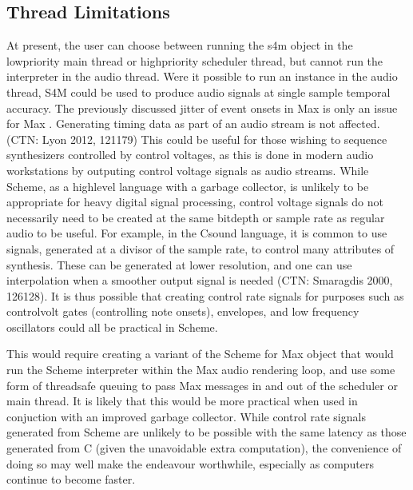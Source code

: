 \documentclass[letterpaper,10pt,english]{sphinxmanual}
\begin{document}
\subsection{Thread Limitations}
\label{\detokenize{conclusion:thread-limitations}}
\sphinxAtStartPar
At present, the user can choose between running the s4m object in the
low\sphinxhyphen{}priority main thread or high\sphinxhyphen{}priority scheduler thread, but cannot
run the interpreter in the audio thread.
Were it possible to run an instance in the audio thread, S4M could be
used to produce audio signals at single sample temporal accuracy.
The previously discussed jitter of event onsets in Max is only an issue
for Max . Generating timing data as part of an audio stream
is not affected. (CTN: Lyon 2012, 121\sphinxhyphen{}179)
This could be useful for those wishing to sequence synthesizers controlled
by control voltages, as this is done in modern audio workstations by outputing
control voltage signals as audio streams.
While Scheme, as a high\sphinxhyphen{}level language with a garbage collector, is unlikely
to be appropriate for heavy digital signal processing, control voltage
signals do not necessarily need to be created at the same bit\sphinxhyphen{}depth or
sample rate as regular audio to be useful. For example, in the Csound language,
it is common to use  signals, generated at a divisor of the sample
rate, to control many attributes of synthesis. These can be generated
at lower resolution, and one can use interpolation when a smoother output
signal is needed (CTN: Smaragdis 2000, 126\sphinxhyphen{}128).
It is thus possible that creating
control rate signals for purposes such as control\sphinxhyphen{}volt gates (controlling note onsets),
envelopes, and low frequency oscillators could all be practical in Scheme.

\sphinxAtStartPar
This would require creating a variant of the Scheme for Max object that would
run the Scheme interpreter within the Max audio rendering loop,
and use some form of thread\sphinxhyphen{}safe queuing to pass Max messages in and out of the
scheduler or main thread.
It is likely that this would be more practical when used in conjuction with
an improved garbage collector.
While control rate signals generated from Scheme are unlikely to be possible
with the same latency as those generated from C (given the unavoidable extra
computation), the convenience of doing so may well make the endeavour worthwhile,
especially as computers continue to become faster.
\end{document}
